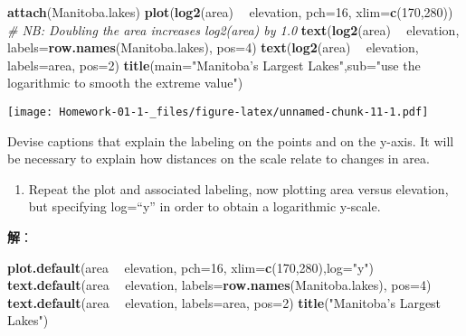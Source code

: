 \documentclass[
]{article}
\newenvironment{Shaded}{\begin{snugshade}}{\end{snugshade}}
\newcommand{\CommentTok}[1]{\textcolor[rgb]{0.56,0.35,0.01}{\textit{#1}}}
\newcommand{\DataTypeTok}[1]{\textcolor[rgb]{0.13,0.29,0.53}{#1}}
\newcommand{\DecValTok}[1]{\textcolor[rgb]{0.00,0.00,0.81}{#1}}
\newcommand{\KeywordTok}[1]{\textcolor[rgb]{0.13,0.29,0.53}{\textbf{#1}}}
\newcommand{\NormalTok}[1]{#1}
\newcommand{\OperatorTok}[1]{\textcolor[rgb]{0.81,0.36,0.00}{\textbf{#1}}}
\newcommand{\StringTok}[1]{\textcolor[rgb]{0.31,0.60,0.02}{#1}}
\providecommand{\tightlist}{%
  \setlength{\itemsep}{0pt}\setlength{\parskip}{0pt}}
\begin{document}
\begin{Shaded}
\begin{Highlighting}[]
\KeywordTok{attach}\NormalTok{(Manitoba.lakes)}
\KeywordTok{plot}\NormalTok{(}\KeywordTok{log2}\NormalTok{(area) }\OperatorTok{~}\StringTok{ }\NormalTok{elevation, }\DataTypeTok{pch=}\DecValTok{16}\NormalTok{, }\DataTypeTok{xlim=}\KeywordTok{c}\NormalTok{(}\DecValTok{170}\NormalTok{,}\DecValTok{280}\NormalTok{))}
\CommentTok{# NB: Doubling the area increases log2(area) by 1.0}
\KeywordTok{text}\NormalTok{(}\KeywordTok{log2}\NormalTok{(area) }\OperatorTok{~}\StringTok{ }\NormalTok{elevation, }\DataTypeTok{labels=}\KeywordTok{row.names}\NormalTok{(Manitoba.lakes), }\DataTypeTok{pos=}\DecValTok{4}\NormalTok{)}
\KeywordTok{text}\NormalTok{(}\KeywordTok{log2}\NormalTok{(area) }\OperatorTok{~}\StringTok{ }\NormalTok{elevation, }\DataTypeTok{labels=}\NormalTok{area, }\DataTypeTok{pos=}\DecValTok{2}\NormalTok{) }
\KeywordTok{title}\NormalTok{(}\DataTypeTok{main=}\StringTok{"Manitoba’s Largest Lakes"}\NormalTok{,}\DataTypeTok{sub=}\StringTok{"use the logarithmic to smooth the extreme value"}\NormalTok{)}
\end{Highlighting}
\end{Shaded}

\texttt{[image: Homework-01-1-\_files/figure-latex/unnamed-chunk-11-1.pdf]}

Devise captions that explain the labeling on the points and on the
y-axis. It will be necessary to explain how distances on the scale
relate to changes in area.

\begin{enumerate}
\def\labelenumi{(\alph{enumi})}
\setcounter{enumi}{1}
\tightlist
\item
  Repeat the plot and associated labeling, now plotting area versus
  elevation, but specifying log=``y'' in order to obtain a logarithmic
  y-scale.
\end{enumerate}

\textbf{解}：

\begin{Shaded}
\begin{Highlighting}[]
\KeywordTok{plot.default}\NormalTok{(area }\OperatorTok{~}\StringTok{ }\NormalTok{elevation, }\DataTypeTok{pch=}\DecValTok{16}\NormalTok{, }\DataTypeTok{xlim=}\KeywordTok{c}\NormalTok{(}\DecValTok{170}\NormalTok{,}\DecValTok{280}\NormalTok{),}\DataTypeTok{log=}\StringTok{"y"}\NormalTok{)}
\KeywordTok{text.default}\NormalTok{(area }\OperatorTok{~}\StringTok{ }\NormalTok{elevation, }\DataTypeTok{labels=}\KeywordTok{row.names}\NormalTok{(Manitoba.lakes), }\DataTypeTok{pos=}\DecValTok{4}\NormalTok{)}
\KeywordTok{text.default}\NormalTok{(area }\OperatorTok{~}\StringTok{ }\NormalTok{elevation, }\DataTypeTok{labels=}\NormalTok{area, }\DataTypeTok{pos=}\DecValTok{2}\NormalTok{) }
\KeywordTok{title}\NormalTok{(}\StringTok{"Manitoba’s Largest Lakes"}\NormalTok{)}
\end{Highlighting}
\end{Shaded}
\end{document}
